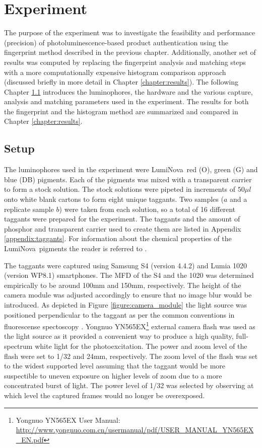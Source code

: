 \documentclass[thesis.tex]{subfiles}
\begin{document}
\chapter{Experiment}
\label{chapter:experiment}

The purpose of the experiment was to investigate the feasibility and performance (precision) of photoluminescence-based product authentication using the fingerprint method described in the previous chapter. Additionally, another set of results was computed by replacing the fingerprint analysis and matching steps with a more computationally expensive histogram comparison approach (discussed briefly in more detail in Chapter \ref{chapter:results}). The following Chapter \ref{chapter:setup} introduces the luminophores, the hardware and the various capture, analysis and matching parameters used in the experiment. The results for both the fingerprint and the histogram method are summarized and compared in Chapter \ref{chapter:results}.

\section{Setup}
\label{chapter:setup}

The luminophores used in the experiment were LumiNova\textregistered\ red (O), green (G) and blue (DB) pigments. Each of the pigments was mixed with a transparent carrier to form a stock solution. The stock solutions were pipeted in increments of $50\mu l$ onto white blank cartons to form eight unique taggants. Two samples ($a$ and a replicate sample $b$) were taken from each solution, so a total of 16 different taggants were prepared for the experiment. The taggants and the amount of phosphor and transparent carrier used to create them are listed in Appendix \ref{appendix:taggants}. For information about the chemical properties of the LumiNova\textregistered\ pigments the reader is referred to \cite{luminova}.

The taggants were captured using Samsung S4 (version 4.4.2) and Lumia 1020 (version WP8.1) smartphones. The MFD of the S4 and the 1020 was determined empirically to be around 100mm and 150mm, respectively. The height of the camera module was adjusted accordingly to ensure that no image blur would be introduced. As depicted in Figure \ref{figure:camera_module} the light source was positioned perpendicular to the taggant as per the common conventions in fluorescense spectoscopy \cite{spectroscopy-principles}. Yongnuo YN565EX\footnote{Yongnuo YN565EX User Manual: \url{http://www.yongnuo.com.cn/usermanual/pdf/USER_MANUAL_YN565EX_EN.pdf}} external camera flash was used as the light source as it provided a convenient way to produce a high quality, full-spectrum white light for the photoexcitation. The power and zoom level of the flash were set to 1/32 and 24mm, respectively. The zoom level of the flash was set to the widest supported level assuming that the taggant would be more suspectible to uneven exposure on higher levels of zoom due to a more concentrated burst of light. The power level of 1/32 was selected by observing at which level the captured frames would no longer be overexposed.
\end{document}
